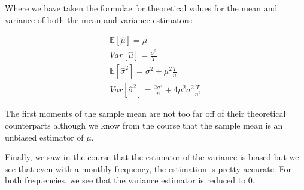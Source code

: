\documentclass[10pt]{article}
\newcommand{\Ebb}{\mathbb{E}}
\newenvironment{exercise}[2][Exercise]{\begin{trivlist}
  \item[\hskip \labelsep {\bfseries #1}\hskip \labelsep {\bfseries #2.}]}{\end{trivlist}}
\begin{document}
\begin{exercise}{3}
	\bigbreak

	Where we have taken the formulae for theoretical values for the mean and variance of both the mean and variance estimators:
	
	\begin{align*}
		\Ebb[\hat{\mu}] = \mu \\
		Var[\hat{\mu}] = \frac{\sigma^{2}}{T} \\
		\Ebb[\hat{\sigma}^{2}] = \sigma^{2} + \mu^{2} \frac{T}{n} \\
		Var[\hat{\sigma}^{2}] = \frac{2\sigma^{4}}{n} + 4\mu^{2}\sigma^{2}\frac{T}{n^{2}}
	\end{align*}
	
	The first moments of the sample mean are not too far off of their theoretical counterparts although we know from the course that the sample mean is an unbiased estimator of $\mu$.
	
	\smallbreak
	
	Finally, we saw in the course that the estimator of the variance is biased but we see that even with a monthly frequency, the estimation is pretty accurate. For both frequencies, we see that the variance estimator is reduced to 0.
  
  \end{exercise}

	\newpage
	
\end{document}
